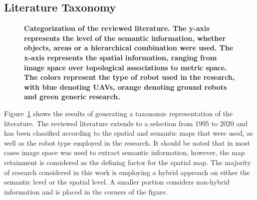 \documentclass[twocolumn,letterpaper]{IEEEAerospaceCLS}  %
\begin{document}
\subsection{Literature Taxonomy} \label{ssec:ResLit}
\begin{figure}
    \centering
    \caption{\bf{
        Categorization of the reviewed literature. The y-axis represents the level of the semantic information, whether objects, areas or a hierarchical combination were used. The x-axis represents the spatial information, ranging from image space over topological associations to metric space. The colors represent the type of robot used in the research, with blue denoting UAVs, orange denoting ground robots and green generic research.
    }}
    \label{fig:LitRes}
\end{figure}
Figure~\ref{fig:LitRes} shows the results of generating a taxonomic representation of the literature. The reviewed literature extends to a selection from 1995 to 2020 and has been classified according to the spatial and semantic maps that were used, as well as the robot type employed in the research. It should be noted that in most cases image space was used to extract semantic information, however, the map retainment is considered as the defining factor for the spatial map. The majority  of research considered in this work is employing a hybrid approach on either the semantic level or the spatial level. A smaller portion considers non-hybrid information and is placed in the corners of the figure.  
\end{document}
